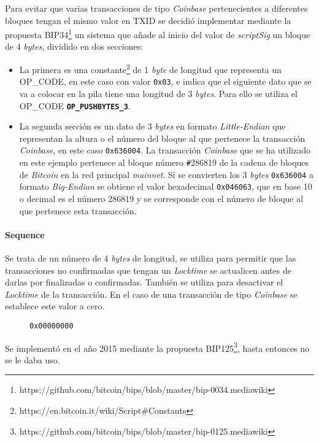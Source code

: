 \documentclass{article}
\begin{document}
    Para evitar que varias transacciones de tipo \textit{Coinbase} pertenecientes a diferentes bloques tengan el mismo valor en TXID se decidió implementar mediante la propuesta BIP34\footnote{https://github.com/bitcoin/bips/blob/master/bip-0034.mediawiki} un sistema que añade al inicio del valor de \textit{scriptSig} un bloque de 4 \textit{bytes}, dividido en dos secciones:
    
    \begin{itemize}
    \item La primera es una constante\footnote{https://en.bitcoin.it/wiki/Script\#Constants} de 1 \textit{byte} de longitud que representa un OP\_CODE, en este caso con valor \texttt{0x03}, e indica que el siguiente dato que se va a colocar en la pila tiene una longitud de 3 \textit{bytes}. Para ello se utiliza el OP\_CODE \textbf{\texttt{OP\_PUSHBYTES\_3}}.
    \item La segunda sección es un dato de 3 \textit{bytes} en formato \textit{Little-Endian} que representan la altura o el número del bloque al que pertenece la transacción \textit{Coinbase}, en este caso \texttt{0x636004}. La transacción \textit{Coinbase} que se ha utilizado en este ejemplo pertenece al bloque número \texttt{\#}286819 de la cadena de bloques de \textit{Bitcoin} en la red principal \textit{mainnet}. Si se convierten los 3 \textit{bytes} \texttt{0x636004} a formato \textit{Big-Endian} se obtiene el valor hexadecimal \texttt{0x046063}, que en base 10 o decimal es el número 286819 y se corresponde con el número de bloque al que pertenece esta transacción.
    \end{itemize}
    
    \paragraph{Sequence}
    Se trata de un número de 4 \textit{bytes} de longitud, se utiliza para permitir que las transacciones no confirmadas que tengan un \textit{Locktime} se actualicen antes de darlas por finalizadas o confirmadas. También se utiliza para desactivar el \textit{Locktime} de la transacción. En el caso de una transacción de tipo \textit{Coinbase} se establece este valor a cero.
    \begin{figure}[H]
        \texttt{0x00000000}
    \end{figure}
    Se implementó en el año 2015 mediante la propuesta BIP125\footnote{https://github.com/bitcoin/bips/blob/master/bip-0125.mediawiki}, hasta entonces no se le daba uso.
    
\end{document}
